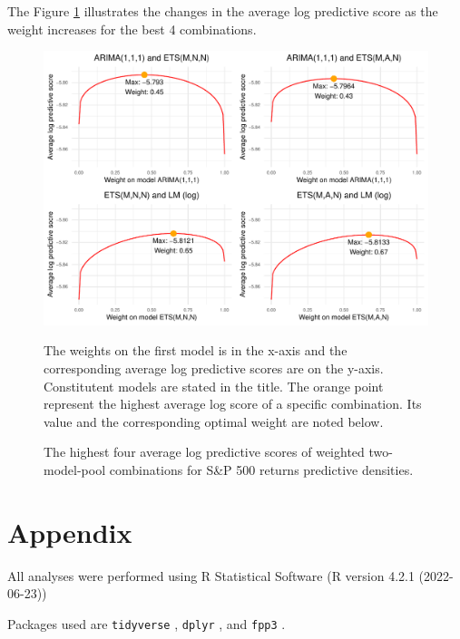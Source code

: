 \documentclass{monashthesis}
\begin{document}
\vspace{0.3cm}

The Figure \ref{fig:best4} illustrates the changes in the average log predictive score as the weight increases for the best 4 combinations.

\vspace{0.3cm}

\begin{figure}[htbp!]
\centering
\caption{The highest four average log predictive scores of weighted two-model-pool combinations for S\&P 500 returns predictive densities. }
\includegraphics{figures/best4.pdf}
\begin{flushleft}
{\footnotesize The weights on the first model is in the x-axis and the corresponding average log predictive scores are on the y-axis. Constitutent models are stated in the title. The orange point represent the highest average log score of a specific combination. Its value and the corresponding optimal weight are noted below.}\\
\end{flushleft}
\label{fig:best4}
\end{figure}

\appendix

\hypertarget{appendix}{%
\chapter{Appendix}\label{appendix}}

All analyses were performed using R Statistical Software (R version 4.2.1 (2022-06-23))

Packages used are \texttt{tidyverse} \autocite{tidy19}, \texttt{dplyr} \autocite{dplyr23}, and \texttt{fpp3} \autocite{fpp23}.
\end{document}
